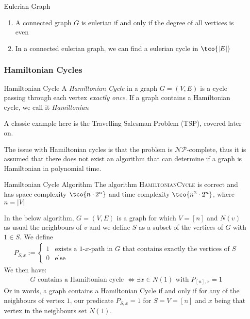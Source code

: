 \begin{theorem}[]{Eulerian Graph}
    \begin{enumerate}[label=\alph*)]
        \item A connected graph $G$ is eulerian if and only if the degree of all vertices is even
        \item In a connected eulerian graph, we can find a eulerian cycle in $\tco{|E|}$
    \end{enumerate}
\end{theorem}


\newpage
\subsubsection{Hamiltonian Cycles}
\begin{definition}[]{Hamiltonian Cycle}
    A \textit{Hamiltonian Cycle} in a graph $G = (V, E)$ is a cycle passing through each vertex \textit{exactly once}.
    If a graph contains a Hamiltonian cycle, we call it \textit{Hamiltonian}
\end{definition}
A classic example here is the Travelling Salesman Problem (TSP), covered later on.

The issue with Hamiltonian cycles is that the problem is $\mathcal{N}\mathcal{P}$-complete, thus it is assumed that there does not exist an algorithm that can determine if a graph is Hamiltonian in polynomial time.

\begin{theorem}[]{Hamiltonian Cycle Algorithm}
    The algorithm \textsc{HamiltonianCycle} is correct and has space complexity $\tco{n \cdot 2^n}$ and time complexity $\tco{n^2 \cdot 2^n}$, where $n = |V|$
\end{theorem}

In the below algorithm, $G = (V, E)$ is a graph for which $V = [n]$ and $N(v)$ as usual the neighbours of $v$ and we define $S$ as a subset of the vertices of $G$ with $1 \in S$.
We define
\begin{align*}
    P_{S, x} := \begin{cases}
                    1 & \text{exists a $1$-$x$-path in $G$ that contains exactly the vertices of $S$} \\
                    0 & \text{else}
                \end{cases}
\end{align*}
We then have:
\begin{align*}
    G \text{ contains a Hamiltonian cycle } \Longleftrightarrow \exists x \in N(1) \text{ with } P_{[n], x} = 1
\end{align*}
Or in words, a graph contains a Hamiltonian Cycle if and only if for any of the neighbours of vertex $1$, our predicate $P_{S, x} = 1$ for $S = V = [n]$ and $x$ being that vertex in the neighbours set $N(1)$.

